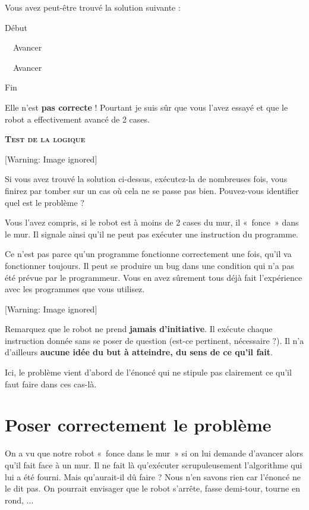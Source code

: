 \bigskip

{
Vous avez peut-être trouvé la solution suivante :}

{\sffamily
Début}

{\sffamily
\ \ Avancer}

{\sffamily
\ \ Avancer}

{\sffamily
Fin}

{
Elle n'est \textbf{pas correcte} ! Pourtant je suis sûr
que vous l'avez essayé et que le robot a effectivement
avancé de 2 cases. }

{\sffamily\bfseries\scshape
Test de la logique}

\begin{center}
 [Warning: Image ignored] %

\end{center}
{
Si vous avez trouvé la solution ci-dessus, exécutez-la de nombreuses
fois, vous finirez par tomber sur un cas où cela ne se passe pas bien.
Pouvez-vous identifier quel est le problème ?}


\bigskip

{
Vous l'avez compris, si le robot est à moins de 2 cases
du mur, il «~fonce~» dans le mur. Il signale ainsi
qu'il ne peut pas exécuter une instruction du
programme.}

{
Ce n'est pas parce qu'un programme
fonctionne correctement une fois, qu'il va fonctionner
toujours. Il peut se produire un bug dans une condition qui
n'a pas été prévue par le programmeur. Vous en avez
sûrement tous déjà fait l'expérience avec les
programmes que vous utilisez.}

\begin{center}
 [Warning: Image ignored] %

\end{center}
{
Remarquez que le robot ne prend \textbf{jamais
d'initiative}. Il exécute chaque instruction donnée
sans se poser de question (est-ce pertinent, nécessaire ?). Il
n'a d'ailleurs \textbf{aucune idée du
but à atteindre, du sens de ce qu'il fait}.}

{
Ici, le problème vient d'abord de
l'énoncé qui ne stipule pas clairement ce
qu'il faut faire dans ces cas-là. }

\section{Poser correctement le problème}
{
On a vu que notre robot «~fonce dans le mur~» si on lui demande
d'avancer alors qu'il fait face à un
mur. Il ne fait là qu'exécuter scrupuleusement
l'algorithme qui lui a été fourni. Mais
qu'aurait-il dû faire ? Nous n'en
savons rien car l'énoncé ne le dit pas. On pourrait
envisager que le robot s'arrête, fasse demi-tour,
tourne en rond, ...}


